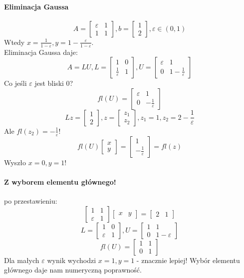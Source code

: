 \documentclass{article}
\begin{document}
\paragraph{Eliminacja Gaussa}
$$A=\begin{bmatrix}
\varepsilon&1\\
1&1
\end{bmatrix}, b= \begin{bmatrix}
1\\2
\end{bmatrix}, \varepsilon\in(0,1)$$
Wtedy $ x=\frac{1}{1-\varepsilon} , y=1-\frac{\varepsilon}{1-\varepsilon}$.\\
Eliminacja Gaussa daje:
$$A=LU, L=\begin{bmatrix}
1&0\\
\frac1\varepsilon&1
\end{bmatrix}, U=\begin{bmatrix}
\varepsilon&1\\
0&1-\frac1\varepsilon
\end{bmatrix}
$$
Co jeśli $ \varepsilon $ jest bliski 0?
$$ fl(U) = \begin{bmatrix}
\varepsilon&1\\
0&-\frac1\varepsilon
\end{bmatrix} $$
$$Lz=\begin{bmatrix}1\\2\end{bmatrix},
z=\begin{bmatrix}z_1\\z_2\end{bmatrix}, z_1=1, z_2=2-\frac1\varepsilon$$
Ale $ fl(z_2)=-\frac1\varepsilon $!
$$fl(U)\begin{bmatrix}
x\\y
\end{bmatrix}=\begin{bmatrix}
1\\-\frac{1}{\varepsilon}
\end{bmatrix}=fl(z)$$
Wyszło $ x = 0, y = 1 $!
\paragraph{Z wyborem elementu głównego!}
po przestawieniu:
$$\begin{bmatrix}1&1\\\varepsilon&1\end{bmatrix}
\begin{bmatrix}x&y\end{bmatrix} = 
\begin{bmatrix}2&1\end{bmatrix}$$
$$L=\begin{bmatrix}
1&0\\
\varepsilon&1
\end{bmatrix}, U=\begin{bmatrix}
1&1\\
0&1-\varepsilon
\end{bmatrix}
$$
$$
fl(U)=\begin{bmatrix}
1&1\\
0&1
\end{bmatrix}
$$
Dla małych $ \varepsilon $ wynik wychodzi $ x=1, y=1 $ - znacznie lepiej! Wybór elementu głównego daje nam numeryczną poprawność.
\end{document}
